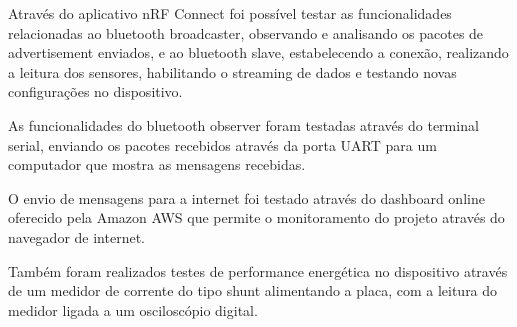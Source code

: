 Através do aplicativo nRF Connect foi possível testar as funcionalidades
relacionadas ao bluetooth broadcaster, observando e analisando os pacotes de
advertisement enviados, e ao bluetooth slave, estabelecendo a conexão,
realizando a leitura dos sensores, habilitando o streaming de dados e testando
novas configurações no dispositivo.

As funcionalidades do bluetooth observer foram testadas através do terminal
serial, enviando os pacotes recebidos através da porta UART para um computador
que mostra as mensagens recebidas.

O envio de mensagens para a internet foi testado através do dashboard online
oferecido pela Amazon AWS que permite o monitoramento do projeto através do
navegador de internet.

Também foram realizados testes de performance energética no dispositivo através
de um medidor de corrente do tipo shunt alimentando a placa, com a leitura do
medidor ligada a um osciloscópio digital.

